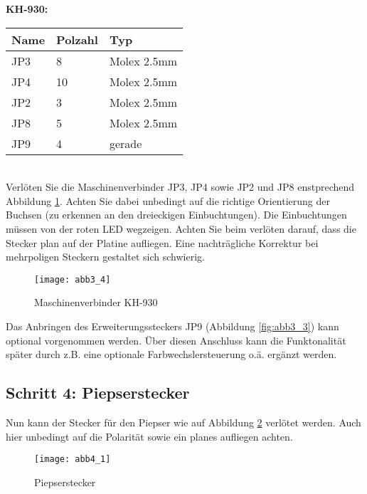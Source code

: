 \documentclass[fleqn,10pt]{SelfArx} %
\begin{document}
\FloatBarrier

\textbf{KH-930:} \\

\begin{tabular}{lll}
\hline
\textbf{Name} & \textbf{Polzahl}  & \textbf{Typ} \\ \hline
JP3           & 8                 & Molex 2.5mm  \\ \hline
JP4           & 10                & Molex 2.5mm  \\ \hline
JP2           & 3                 & Molex 2.5mm  \\ \hline
JP8           & 5                 & Molex 2.5mm  \\ \hline
JP9           & 4                 & gerade       \\ \hline
\end{tabular}\\

Verlöten Sie die Maschinenverbinder JP3, JP4 sowie JP2 und JP8 enstprechend Abbildung \ref{fig:abb3_4}. Achten Sie dabei unbedingt auf die richtige Orientierung der Buchsen (zu erkennen an den dreieckigen Einbuchtungen). Die Einbuchtungen müssen von der roten LED wegzeigen. Achten Sie beim verlöten darauf, dass die Stecker plan auf der Platine aufliegen. Eine nachträgliche Korrektur bei mehrpoligen Steckern gestaltet sich schwierig.

\begin{figure}[tbhp]\centering
\texttt{[image: abb3\_4]}
\caption{Maschinenverbinder KH-930}
\label{fig:abb3_4}
\end{figure}

Das Anbringen des Erweiterungssteckers JP9 (Abbildung \ref{fig:abb3_3}) kann optional vorgenommen werden. Über diesen Anschluss kann die Funktonalität später durch z.B. eine optionale Farbwechslersteuerung o.ä. ergänzt werden. \par

\FloatBarrier

 \subsection*{Schritt 4: Piepserstecker}

Nun kann der Stecker für den Piepser wie auf Abbildung \ref{fig:abb4_1} verlötet werden. Auch hier unbedingt auf die Polarität sowie ein planes aufliegen achten.

\begin{figure}[tbhp]\centering
\texttt{[image: abb4\_1]}
\caption{Piepserstecker}
\label{fig:abb4_1}
\end{figure}
\end{document}
